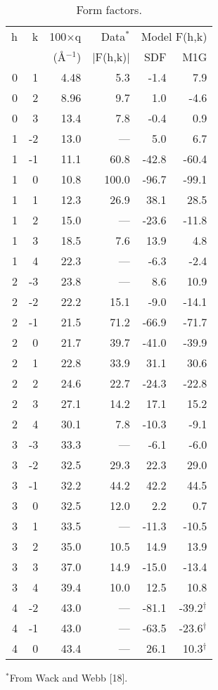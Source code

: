 \pagebreak
\begin{table}
\caption{Form factors.
\label{formfactor}}
\vspace{6pt}
{\small
\begin{tabular}{rrrrrr} 
h & k & 100$\times$q & Data$^{*}$ &
        \multicolumn{2}{c}{Model F(h,k)} \\ \cline{5-6}
& & (\AA$^{-1}$) & $|$F(h,k)$|$ & SDF & M1G \\ \hline
0 &  1 & 4.48  &  5.3  &  -1.4  &  7.9  \\
0 &  2 & 8.96  & 9.7  &  1.0  &  -4.6 \\
0 &  3 & 13.4  &  7.8  &  -0.4   &  0.9 \\
1 &  -2 & 13.0  &  ---  &  5.0  &  6.7   \\
1 &  -1 & 11.1  &  60.8  &  -42.8  &  -60.4 \\
1 &   0 & 10.8  &  100.0  &  -96.7  &  -99.1 \\
1 &   1 & 12.3  &  26.9  &  38.1  &  28.5 \\
1 &   2 & 15.0  &  ---  &  -23.6  &  -11.8 \\
1 &   3 & 18.5  &  7.6  &  13.9  &  4.8 \\
1 &   4 & 22.3  &  ---  &  -6.3  &  -2.4 \\
2 &  -3 & 23.8  &  ---  &  8.6  &  10.9 \\
2 &  -2 & 22.2  &  15.1  &  -9.0  &  -14.1 \\
2 &  -1 & 21.5  &  71.2  &  -66.9  &  -71.7 \\
2 &   0 & 21.7  &  39.7  &  -41.0  &  -39.9 \\
2 &   1 & 22.8  &  33.9  &  31.1  &  30.6 \\
2 &   2 & 24.6  &  22.7  &  -24.3  &  -22.8 \\
2 &   3 & 27.1  &  14.2  &  17.1  &  15.2 \\
2 &   4 & 30.1  &  7.8  &  -10.3  &  -9.1 \\
3 &  -3 & 33.3  &  ---  &  -6.1  &  -6.0 \\
3 &  -2 & 32.5  &  29.3  &  22.3  &  29.0 \\
3 &  -1 & 32.2  &  44.2  &  42.2  &  44.5 \\
3 &   0 & 32.5  &  12.0    &  2.2  &  0.7   \\
3 &   1 & 33.5  &  ---  &  -11.3  &  -10.5 \\
3 &   2 & 35.0  &  10.5  &  14.9  &  13.9 \\
3 &   3 & 37.0  &  14.9  &  -15.0  &  -13.4 \\
3 &   4 & 39.4  &  10.0  &  12.5  &  10.8 \\
4 &  -2 & 43.0  &  ---  &  -81.1  &  -39.2$^{\dag}$ \\
4 &  -1 & 43.0  &  ---  &  -63.5  &  -23.6$^{\dag}$ \\
4 &   0 & 43.4  &  ---  &  26.1  &  10.3$^{\dag}$ \\
\end{tabular}
}
{\small
\indent $^{*}$From Wack and Webb [18].

}
\end{table}
